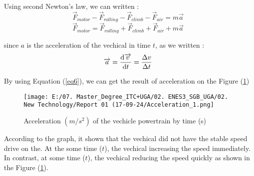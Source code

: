 \documentclass[12pt,a4paper]{article}
\numberwithin{equation}{section}
\begin{document}
	Using second Newton's law, we can written :
	\begin{equation}
		\overrightarrow{F}_{motor} - \overrightarrow{F}_{rolling} -\overrightarrow{F}_{climb} - \overrightarrow{F}_{air} = m\overrightarrow{a}
		\label{eq4}
	\end{equation}
	\begin{equation}
		\overrightarrow{F}_{motor} = \overrightarrow{F}_{rolling} + \overrightarrow{F}_{climb} + \overrightarrow{F}_{air} + m\overrightarrow{a}
		\label{eq5}
	\end{equation}

	since $a$ is the acceleration of the vechical in time $t$, as we written : 
	\begin{equation}
		\overrightarrow{a} = \derivative{\overrightarrow{v}}{t} = \frac{\Delta v}{\Delta t}
		\label{eq6}
	\end{equation}

	By using Equation (\ref{eq6}), we can get the result of acceleration on the Figure (\ref{3})
	\begin{figure}[h]
		\centering 
		\texttt{[image: E:/07. Master\_Degree\_ITC+UGA/02. ENES3\_SGB\_UGA/02. New Technology/Report 01 (17-09-24/Acceleration\_1.png]}
		\caption{\small {Acceleration $(m/s^2)$ of the vechicle powertrain by time (s)}}
		\label{3}
	\end{figure}

	According to the graph, it shown that the vechical did not have the stable speed drive on the. At the some time ($t$), the vechical increasing the speed immediately. In contrast, at some time ($t$), the vechical reducing the speed quickly as shown in the Figure (\ref{3}).
\end{document}
